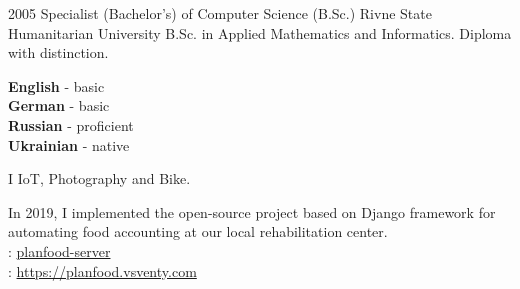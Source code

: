 \documentclass[9pt]{developercv} %
\begin{document}


\begin{entrylist}
	\entry
		{2005}
        {Specialist (Bachelor's) of Computer Science (B.Sc.)}
		{Rivne State Humanitarian University}
		{B.Sc. in Applied Mathematics and Informatics. Diploma with distinction.}
\end{entrylist}


\begin{minipage}[t]{0.3\textwidth}
	\vspace{-\baselineskip} %

	
	\textbf{English} - basic\\
	\textbf{German} - basic\\
    \textbf{Russian} - proficient\\
	\textbf{Ukrainian} - native
\end{minipage}
\hfill
\begin{minipage}[t]{0.3\textwidth}
	\vspace{-\baselineskip} %
	
	
    I \textcolor{red}\faHeart{} IoT, Photography and Bike.
\end{minipage}
\hfill
\begin{minipage}[t]{0.3\textwidth}
	\vspace{-\baselineskip} %
	
	
	In 2019, I implemented the open-source project based on Django framework for automating food accounting at our local rehabilitation center.\\
    \faGithub{}: {\href{https://github.com/vsventy/planfood-server/}{planfood-server}}\\
    \faLink{}: {\href{https://planfood.vsventy.com}{https://planfood.vsventy.com}}
\end{minipage}

\end{document}

